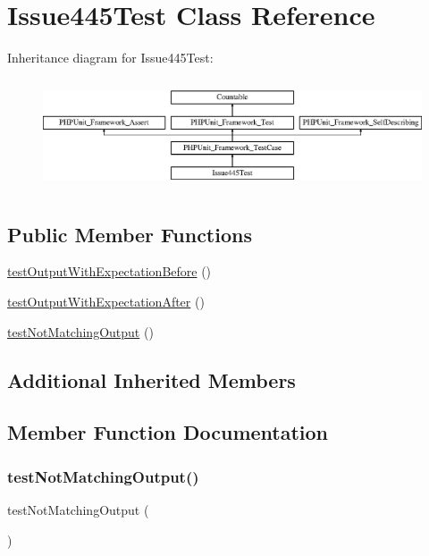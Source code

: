 \hypertarget{class_issue445_test}{}\section{Issue445\+Test Class Reference}
\label{class_issue445_test}
Inheritance diagram for Issue445\+Test\+:\begin{figure}[H]
\begin{center}
\leavevmode
\includegraphics[height=3.303835cm]{class_issue445_test}
\end{center}
\end{figure}
\subsection*{Public Member Functions}
\begin{DoxyCompactItemize}
\item 
\mbox{\hyperlink{class_issue445_test_adf7c386bf9eafdf68da61e980d940938}{test\+Output\+With\+Expectation\+Before}} ()
\item 
\mbox{\hyperlink{class_issue445_test_acaa232f0410700a492c839aae855a504}{test\+Output\+With\+Expectation\+After}} ()
\item 
\mbox{\hyperlink{class_issue445_test_a06acca02484700b576896e5db0749b4a}{test\+Not\+Matching\+Output}} ()
\end{DoxyCompactItemize}
\subsection*{Additional Inherited Members}


\subsection{Member Function Documentation}
\mbox{\label{class_issue445_test_a06acca02484700b576896e5db0749b4a}} 
\subsubsection{\texorpdfstring{test\+Not\+Matching\+Output()}{testNotMatchingOutput()}}
{\footnotesize\ttfamily test\+Not\+Matching\+Output (\begin{DoxyParamCaption}{ }\end{DoxyParamCaption})}

